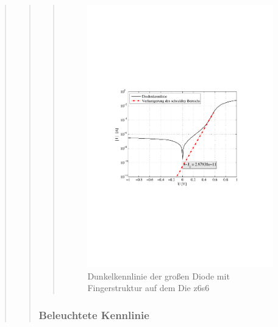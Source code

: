 \begin{quote}
\begin{quote}
\begin{quote}
            \begin{figure}[H]
                \centering
                \includegraphics[scale=0.7, trim = 3.1cm 9.2cm 4cm 8.5cm, clip]{KennlinienBilder/finger_dunkel_kennlinie_z6_s6.pdf}
                \caption{Dunkelkennlinie der großen Diode mit Fingerstruktur auf dem Die z6s6}
                \label{fig:finger_dunkel_kennlinie_z6_s6.pdf}
            \end{figure}



        \end{quote} %


        \subsubsection{Beleuchtete Kennlinie}
        \begin{quote}
            

\end{quote}
\end{quote}
\end{quote}
